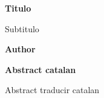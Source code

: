 \clearpage
\thispagestyle{empty}
\begin{center}
	\Large
	\textbf{Titulo}
	
	\vspace{0.4cm}
	\large
	Subtitulo
	
	\vspace{0.4cm}
	\textbf{Author}
	
	\vspace{0.9cm}
	\textbf{Abstract catalan}
\end{center}
Abstract traducir catalan